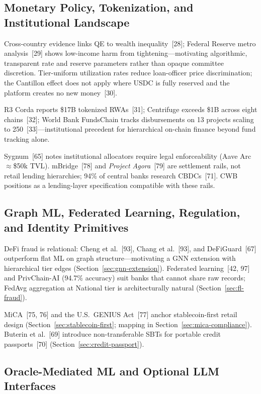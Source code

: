 \documentclass[12pt, a4paper]{report}
\begin{document}
\subsection{Monetary Policy, Tokenization, and Institutional Landscape}
\label{sec:lit-institutional}

Cross-country evidence links QE to wealth inequality~[28]; Federal Reserve metro analysis~[29] shows low-income harm from tightening---motivating algorithmic, transparent rate and reserve parameters rather than opaque committee discretion. Tier-uniform utilization rates reduce loan-officer price discrimination; the Cantillon effect does not apply where USDC is fully reserved and the platform creates no new money~[30].

R3 Corda reports \$17B tokenized RWAs~[31]; Centrifuge exceeds \$1B across eight chains~[32]; World Bank FundsChain tracks disbursements on 13 projects scaling to 250~[33]---institutional precedent for hierarchical on-chain finance beyond fund tracking alone.

Sygnum~[65] notes institutional allocators require legal enforceability (Aave Arc $\approx$\$50k TVL). mBridge~[78] and \textit{Project Agora}~[79] are settlement rails, not retail lending hierarchies; 94\% of central banks research CBDCs~[71]. CWB positions as a lending-layer specification compatible with these rails.

\subsection{Graph ML, Federated Learning, Regulation, and Identity Primitives}

DeFi fraud is relational: Cheng et al.~[93], Chang et al.~[93], and DeFiGuard~[67] outperform flat ML on graph structure---motivating a GNN extension with hierarchical tier edges (Section~\ref{sec:gnn-extension}). Federated learning~[42, 97] and PrivChain-AI (94.7\% accuracy) suit banks that cannot share raw records; FedAvg aggregation at National tier is architecturally natural (Section~\ref{sec:fl-fraud}).

MiCA~[75, 76] and the U.S.\ GENIUS Act~[77] anchor stablecoin-first retail design (Section~\ref{sec:stablecoin-first}; mapping in Section~\ref{sec:mica-compliance}). Buterin et al.~[69] introduce non-transferable SBTs for portable credit passports~[70] (Section~\ref{sec:credit-passport}).

\subsection{Oracle-Mediated ML and Optional LLM Interfaces}
\label{sec:lit-llm}
\end{document}
